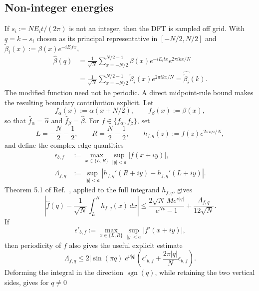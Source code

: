\documentclass[aps,floatfix,10pt,amssymb,amsfont,amsmath,superscriptaddress,float,nofootinbib,longbibliography,nobalancelastpage,twocolumn]{revtex4-2}
\begin{document}
\subsection{Non-integer energies}
If $s_i:=NE_it/(2\pi)$ is not an integer, then the DFT is sampled off grid. With $q=k-s_i$ chosen as its principal representative in $[-N/2,N/2]$ and $\widetilde\beta_i(x):=\beta(x)e^{-iE_itx}$,
\begin{align}
    \hat \beta(q)
    &= \frac{1}{\sqrt N}\sum_{x=-N/2}^{N/2-1}\beta(x)e^{-iE_itx}e^{2\pi ikx/N}\\
    &=\frac{1}{\sqrt N}\sum_{x=-N/2}^{N/2-1}\widetilde\beta_i(x)e^{2\pi ikx/N}
    =\widehat{\widetilde\beta_i}(k).
\end{align}
The modified function need not be periodic. A direct midpoint-rule bound makes the resulting boundary contribution explicit. Let
\begin{equation}
    f_{\alpha}(x):=\alpha(x+N/2),\qquad f_{\beta}(x):=\beta(x),
\end{equation}
so that $\widehat f_{\alpha}=\hat\alpha$ and $\widehat f_{\beta}=\hat\beta$. For $f\in\{f_{\alpha},f_{\beta}\}$, set
\begin{equation}
    L=-\frac N2-\frac12,\qquad R=\frac N2-\frac12,\qquad
    h_{f,q}(z):=f(z)e^{2\pi iqz/N},
\end{equation}
and define the complex-edge quantities
\begin{align}
    \epsilon_{b,f}&:=\max_{x\in\{L,R\}}\sup_{|y|<a}|f(x+iy)|,\\
    \Lambda_{f,q}&:=\sup_{|y|<a}|h_{f,q}'(R+iy)-h_{f,q}'(L+iy)|.
\end{align}
Theorem 5.1 of Ref.~\cite{javed2014trapezoidal}, applied to the full integrand $h_{f,q}$, gives
\begin{equation}
    \left|\widehat f(q)-\frac{1}{\sqrt N}\int_L^R h_{f,q}(x)\,dx\right|
    \leq \frac{2\sqrt N\,M e^{\nu|q|}}{e^{N\nu}-1}
    +\frac{\Lambda_{f,q}}{12\sqrt N}.
\end{equation}
If
\begin{equation}
    \epsilon'_{b,f}:=\max_{x\in\{L,R\}}\sup_{|y|<a}|f'(x+iy)|,
\end{equation}
then periodicity of $f$ also gives the useful explicit estimate
\begin{equation}
    \Lambda_{f,q}\leq 2|\sin(\pi q)|e^{\nu|q|}
    \left(\epsilon'_{b,f}+\frac{2\pi|q|}{N}\epsilon_{b,f}\right).
\end{equation}
Deforming the integral in the direction $\operatorname{sgn}(q)$, while retaining the two vertical sides, gives for $q\neq0$
\end{document}
